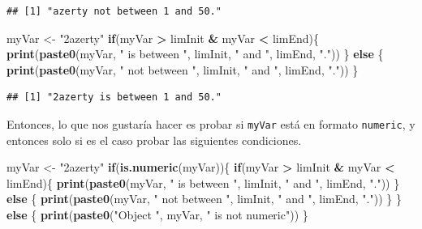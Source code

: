 \documentclass[
]{book}
\newenvironment{Shaded}{\begin{snugshade}}{\end{snugshade}}
\newcommand{\ControlFlowTok}[1]{\textcolor[rgb]{0.13,0.29,0.53}{\textbf{#1}}}
\newcommand{\KeywordTok}[1]{\textcolor[rgb]{0.13,0.29,0.53}{\textbf{#1}}}
\newcommand{\NormalTok}[1]{#1}
\newcommand{\OperatorTok}[1]{\textcolor[rgb]{0.81,0.36,0.00}{\textbf{#1}}}
\newcommand{\StringTok}[1]{\textcolor[rgb]{0.31,0.60,0.02}{#1}}
\begin{document}
\begin{verbatim}
## [1] "azerty not between 1 and 50."
\end{verbatim}

\begin{Shaded}
\begin{Highlighting}[]
\NormalTok{myVar <-}\StringTok{ "2azerty"}
\ControlFlowTok{if}\NormalTok{(myVar }\OperatorTok{>}\StringTok{ }\NormalTok{limInit }\OperatorTok{&}\StringTok{ }\NormalTok{myVar }\OperatorTok{<}\StringTok{ }\NormalTok{limEnd)\{}
  \KeywordTok{print}\NormalTok{(}\KeywordTok{paste0}\NormalTok{(myVar, }\StringTok{" is between "}\NormalTok{, limInit, }\StringTok{" and "}\NormalTok{, limEnd, }\StringTok{"."}\NormalTok{))}
\NormalTok{\} }\ControlFlowTok{else}\NormalTok{ \{}
  \KeywordTok{print}\NormalTok{(}\KeywordTok{paste0}\NormalTok{(myVar, }\StringTok{" not between "}\NormalTok{, limInit, }\StringTok{" and "}\NormalTok{, limEnd, }\StringTok{"."}\NormalTok{))}
\NormalTok{\}}
\end{Highlighting}
\end{Shaded}

\begin{verbatim}
## [1] "2azerty is between 1 and 50."
\end{verbatim}

Entonces, lo que nos gustaría hacer es probar si \texttt{myVar} está en formato \texttt{numeric}, y entonces solo si es el caso probar las siguientes condiciones.

\begin{Shaded}
\begin{Highlighting}[]
\NormalTok{myVar <-}\StringTok{ "2azerty"}
\ControlFlowTok{if}\NormalTok{(}\KeywordTok{is.numeric}\NormalTok{(myVar))\{}
  \ControlFlowTok{if}\NormalTok{(myVar }\OperatorTok{>}\StringTok{ }\NormalTok{limInit }\OperatorTok{&}\StringTok{ }\NormalTok{myVar }\OperatorTok{<}\StringTok{ }\NormalTok{limEnd)\{}
    \KeywordTok{print}\NormalTok{(}\KeywordTok{paste0}\NormalTok{(myVar, }\StringTok{" is between "}\NormalTok{, limInit, }\StringTok{" and "}\NormalTok{, limEnd, }\StringTok{"."}\NormalTok{))}
\NormalTok{  \} }\ControlFlowTok{else}\NormalTok{ \{}
    \KeywordTok{print}\NormalTok{(}\KeywordTok{paste0}\NormalTok{(myVar, }\StringTok{" not between "}\NormalTok{, limInit, }\StringTok{" and "}\NormalTok{, limEnd, }\StringTok{"."}\NormalTok{))}
\NormalTok{  \}}
\NormalTok{\} }\ControlFlowTok{else}\NormalTok{ \{}
  \KeywordTok{print}\NormalTok{(}\KeywordTok{paste0}\NormalTok{(}\StringTok{"Object "}\NormalTok{, myVar, }\StringTok{" is not numeric"}\NormalTok{))}
\NormalTok{\}}
\end{Highlighting}
\end{Shaded}
\end{document}
